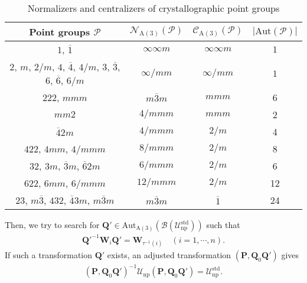 \documentclass[a4paper, 11pt]{article}
\theoremstyle{definition}
\begin{document}
\begin{table}[tb]
  \centering
  \caption{Normalizers and centralizers of crystallographic point groups}
  \label{tab:normalizer_centralizer_pg}
  \begin{tabular}{cccc}
    \hline \hline
    Point groups $\mathcal{P}$
      & $\mathcal{N}_{\mathrm{A}(3)}(\mathcal{P})$
      & $\mathcal{C}_{\mathrm{A}(3)}(\mathcal{P})$
      & $ | \mathrm{Aut}(\mathcal{P}) | $ \\
    \hline
    $1$, $\overline{1}$ & $\infty\infty m$ & $\infty\infty m$ & $1$ \\
    $2$, $m$, $2/m$, $4$, $\overline{4}$, $4/m$, $3$, $\overline{3}$, $6$, $\overline{6}$, $6/m$
      & $\infty / m m$ & $\infty / m m$ & $1$ \\
    $222$, $mmm$ & $m\overline{3}m$ & $mmm$ & 6 \\
    $mm2$ & $4/mmm$ & $mmm$ & 2 \\ %
    $\overline{4}2m$ & $4/mmm$ & $2/m$ & 4 \\
    $422$, $4mm$, $4/mmm$ & $8/mmm$ & $2/m$ & 8 \\
    $32$, $3m$, $\overline{3}m$, $\overline{6}2m$ & $6/mmm$ & $2/m$ & 6 \\
    $622$, $6mm$, $6/mmm$ & $12/mmm$ & $2/m$ & 12 \\
    $23$, $m\overline{3}$, $432$, $\overline{4}3m$, $m\overline{3}m$
      & $m\overline{3}m$ & $\overline{1}$ & 24 \\ %
    \hline \hline
  \end{tabular}
\end{table}

Then, we try to search for $\bm{Q}' \in \mathrm{Aut}_{\mathrm{A}(3)}(\mathcal{B}(\mathcal{U}_{\mathrm{np}}^{\mathrm{std}}))$ such that
\begin{align}
  \bm{Q}'^{-1} \bm{W}_{i} \bm{Q}' = \bm{W}_{\tau^{-1}(i)}
    \quad (i = 1, \cdots, n).
\end{align}
If such a transformation $\bm{Q}'$ exists, an adjusted transformation $(\bm{P}, \bm{Q}_{0}\bm{Q}')$ gives
\begin{align}
  (\bm{P}, \bm{Q}_{0}\bm{Q}')^{-1} \mathcal{U}_{\mathrm{np}} (\bm{P}, \bm{Q}_{0}\bm{Q}') = \mathcal{U}_{\mathrm{np}}^{\mathrm{std}}.
\end{align}


%
\end{document}
